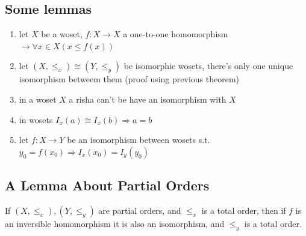 \documentclass[11pt,a4paper]{article}
\begin{document}
\subsection{Some lemmas}
\begin{enumerate}
\item let $X$ be a woset, $f:X\rightarrow X$ a one-to-one homomorphism 
$\rightarrow \forall x\in X(x\le f(x))$
\item let $(X,\le_x)\cong(Y,\le_y)$ be isomorphic wosets, there's only 
one unique isomorphism betweem them (proof using previous theorem)
\item in a woset $X$ a risha can't be have an isomorphism with $X$
\item in wosets $I_x(a)\cong I_x(b) \Rightarrow a=b$
\item let $f:X\rightarrow Y$ be an isomorphism between wosets 
s.t. $y_0=f(x_0) \Rightarrow I_x(x_0)=I_y(y_0)$
\end{enumerate}
\subsection{A Lemma About Partial Orders}
If $(X,\le_x),(Y,\le_y)$ are partial orders, and $\le_x$ is a 
total order, then if $f$ is an inversible homomorphism it is also an 
isomorphism, and $\le_y$ is a total order.
\newpage
\end{document}
